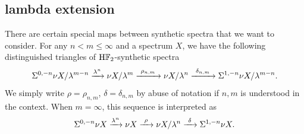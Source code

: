 \documentclass[12pt]{amsart}
\numberwithin{equation}{section}
\newcommand{\HF}{\mathrm{H}\bF_2}
\begin{document}
\subsection{lambda extension}
\begin{notation} \label{not:deltaandrho}
There are certain special maps between synthetic spectra that we want to consider. For any $n<m\le \infty$ and a spectrum $X$, we have the following  distinguished triangles of $\HF$-synthetic spectra
$$\Sigma^{0,-n}\nu X/\lambda^{m-n}\xrightarrow{\lambda^n} \nu X/\lambda^m\xrightarrow{~\rho_{n,m}~} \nu X/\lambda^n\xrightarrow{~\delta_{n,m}~} \Sigma^{1,-n}\nu X/\lambda^{m-n}.$$
We simply write $\rho=\rho_{n,m}$, $\delta=\delta_{n,m}$ by abuse of notation if $n,m$ is understood in the context.
When $m=\infty$, this sequence is interpreted  as
$$\Sigma^{0,-n}\nu X\xrightarrow{\lambda^n} \nu X\xrightarrow{~\rho~} \nu X/\lambda^n\xrightarrow{~\delta~} \Sigma^{1,-n}\nu X.$$


\end{notation}

\end{document}
